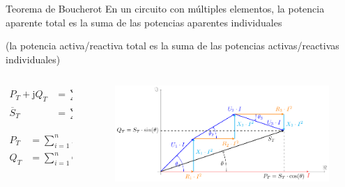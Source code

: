 \documentclass[aspectratio=169, usenames,svgnames,dvipsnames]{beamer}
\begin{document}
\begin{frame}{Teorema de Boucherot}
    \vspace{3mm}
    En un circuito con múltiples elementos, la potencia aparente total es la \alert{suma de las potencias aparentes individuales} 
    
    (la potencia activa/reactiva total es la \alert{suma de las potencias activas/reactivas individuales})
    
    \begin{columns}
    \begin{column}{0.3\columnwidth}
    
        \vspace{-11mm}
        
        \begin{align*}          
          P_T + \mathrm{j}Q_T &= \sum^n_{i = 1} (P_i + \mathrm{j}Q_i)\\
          \overline{S}_T &= \sum_{i = 1}^{n} \overline{S}_i
        \end{align*}

        \vspace{-3mm}
        
        \begin{align*}
            P_T &= \sum_{i = 1}^n P_i\\
            Q_T &= \sum_{i = 1}^n Q_i
        \end{align*}
    \end{column}
    \begin{column}{0.7\linewidth}
        \begin{figure}
        \vspace{-10mm}
    
        \hspace*{-18mm}  \includegraphics[width=1.18\linewidth]{../figs/boucherot.pdf}
        \end{figure}
    \end{column}
    \end{columns}
\end{frame}
\end{document}
